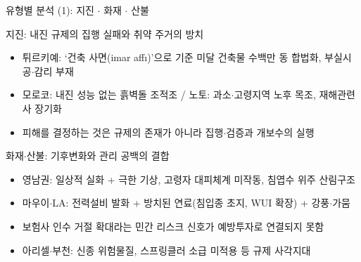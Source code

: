 \documentclass[aspectratio=169,10pt]{beamer}
\newcommand{\fb}[1]{{\fbfont #1}}
\begin{document}
\begin{frame}{유형별 분석 (1): 지진 $\cdot$ 화재 $\cdot$ 산불}
  \begin{block}{지진: 내진 규제의 집행 실패와 취약 주거의 방치}
    \small
    \begin{itemize}
      \item 튀르키예: `건축 사면(imar aff\fb{ı})'으로 기준 미달 건축물 수백만 동 합법화, 부실시공$\cdot$감리 부재
      \item 모로코: 내진 성능 없는 흙벽돌 조적조 / 노토: 과소$\cdot$고령지역 노후 목조, 재해관련사 장기화
      \item[$\Rightarrow$] 피해를 결정하는 것은 규제의 존재가 아니라 \alert{집행$\cdot$검증과 개보수의 실행}
    \end{itemize}
  \end{block}
  \begin{block}{화재$\cdot$산불: 기후변화와 관리 공백의 결합}
    \small
    \begin{itemize}
      \item 영남권: 일상적 실화 + 극한 기상, 고령자 대피체계 미작동, 침엽수 위주 산림구조
      \item 마우이$\cdot$LA: 전력설비 발화 + 방치된 연료(침입종 초지, WUI 확장) + 강풍$\cdot$가뭄
      \item[] \quad 보험사 인수 거절 확대라는 민간 리스크 신호가 \alert{예방투자로 연결되지 못함}
      \item 아리셀$\cdot$부천: 신종 위험물질, 스프링클러 소급 미적용 등 \alert{규제 사각지대}
    \end{itemize}
  \end{block}
\end{frame}
\end{document}
